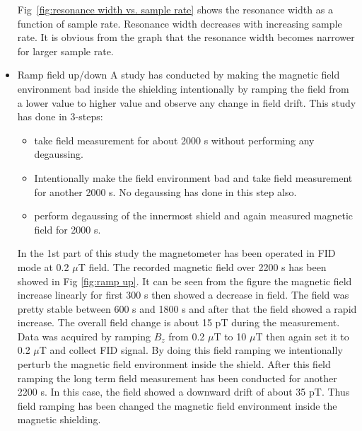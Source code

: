 \begin{itemize}
Fig~\ref{fig:resonance width vs. sample rate} shows the resonance width as a function of sample rate. Resonance width decreases with increasing sample rate.  It is obvious from the graph that the resonance width becomes narrower for larger sample rate.    
   \item Ramp field up/down 
  A study has conducted by making the magnetic field environment bad inside the shielding intentionally  by ramping the field from a lower value to higher value and observe any change in field drift. This study has done in 3-steps: 
  \begin{itemize}
      \item take field measurement for about 2000 s without performing any degaussing.
      \item Intentionally make the field environment bad and take field measurement for another 2000 s. No degaussing has done in this step also.
      \item perform degaussing of the innermost shield and again measured magnetic field for 2000 s.
  \end{itemize}
  In the 1st part of this study the magnetometer has been operated in FID mode at 0.2 $\mu$T field. The recorded magnetic field over 2200 s has been showed in Fig \ref{fig:ramp up}. It can be seen from the figure the magnetic field increase linearly for first 300 s then showed a decrease in field. The field was pretty stable between 600 s and 1800 s and after that the field showed a rapid increase. The overall field change is about 15 pT during the measurement. Data was acquired by ramping $B_z$  from  0.2 $\mu$T to 10 $\mu$T then again set it to 0.2 $\mu$T and collect FID signal. By doing this field ramping we intentionally perturb the magnetic field environment inside the shield. After this field ramping the long term field measurement has been conducted for another 2200 s. In this case, the field showed a downward drift of about 35 pT. Thus field ramping has been changed the magnetic field environment inside the magnetic shielding.
   \begin{figure}
    \centering
 

\end{figure}
\end{itemize}
